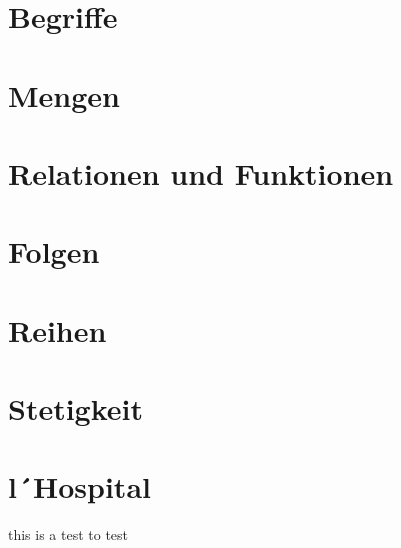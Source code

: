 \documentclass[final, 12pt]{article}
\begin{document}
  

\section{Begriffe}


\section{Mengen}


\section{Relationen und Funktionen}


\section{Folgen}


\section{Reihen}


\section{Stetigkeit}


\section{l´Hospital}


this is a test to test

\newpage
\end{document}
